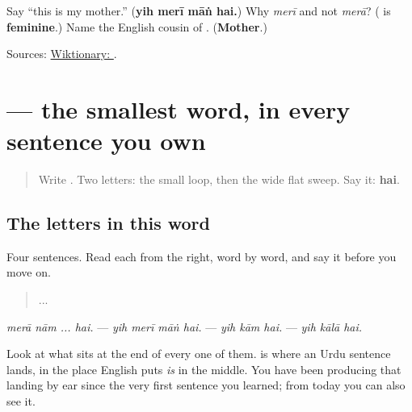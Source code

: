 \begin{tcolorbox}[breakable,colback=teal!4,colframe=teal!35!black,title={Before you move on}]
Say \textquotedblleft{}this is my mother.\textquotedblright{} (\textbf{yih merī māṅ hai.}) Why \emph{merī} and not \emph{merā}? (\textbf{} is \textbf{feminine}.) Name the English cousin of \textbf{}. (\textbf{Mother}.)

Sources: \href{https://en.wiktionary.org/wiki/\%D9\%85\%D8\%A7\%DA\%BA}{Wiktionary: }.
\end{tcolorbox}
\section[\texorpdfstring{\ur{یہ} \ur{میری} \ur{ماں} \ur{ہے} (yih merī māṅ hai)}{یہ میری ماں ہے (yih merī māṅ hai)}]{ — the smallest word, in every sentence you own}

\label{lesson:UR-C17-review-hai}



\begin{quote}
Write . Two letters: the small loop, then the wide flat sweep. Say it: \textbf{hai}.
\end{quote}

\subsection*{The letters in this word}
Four sentences. Read each from the right, word by word, and say it before you move on.

\begin{quote}
  ... 
\end{quote}

\begin{quote}
   
\end{quote}

\begin{quote}
  
\end{quote}

\begin{quote}
  
\end{quote}

\emph{merā nām ... hai.} — \emph{yih merī māṅ hai.} — \emph{yih kām hai.} — \emph{yih kālā hai.}

Look at what sits at the end of every one of them. \textbf{} is where an Urdu sentence lands, in the place English puts \emph{is} in the middle. You have been producing that landing by ear since the very first sentence you learned; from today you can also see it.

